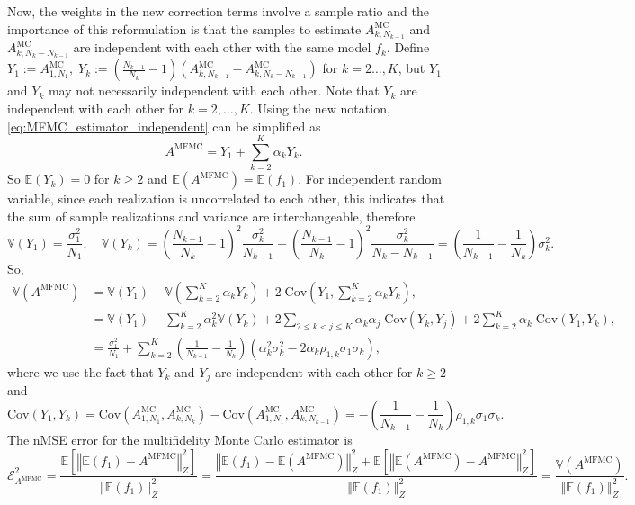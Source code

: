 \documentclass[final,3p,times,11pt]{elsarticle}
\begin{document}
Now, the weights in the new correction terms involve a sample ratio and the importance of this reformulation is that the samples to estimate $A_{k,N_{k-1}}^{\text{MC}}$ and $A_{k,N_k-N_{k-1}}^{\text{MC}}$ are independent with each other with the same model $f_k$. Define $Y_1 :=A^{\text{MC}}_{1,N_1},\; Y_k:=(\frac{N_{k-1}}{N_{k}}-1)(A_{k,N_{k-1}}^{\text{MC}}- A_{k,N_k-N_{k-1}}^{\text{MC}})$ for $k=2\ldots, K$, but $Y_1$ and $Y_k$ may not necessarily independent with each other.  Note that $Y_k$ are independent with each other for $k=2,\ldots, K$. Using the new notation, \eqref{eq:MFMC_estimator_independent} can be simplified as 
\[
A^{\text{MFMC}} = Y_1 + \sum_{k=2}^K \alpha_k Y_k.
\]
So $\mathbb{E}(Y_k) = 0$ for $k\ge 2$ and $\mathbb{E}(A^{\text{MFMC}}) = \mathbb{E}(f_1) $. For independent random variable, since each realization is uncorrelated to each other, this indicates that the sum of sample realizations and variance are interchangeable, therefore
\[
\mathbb{V}\left(Y_1\right) = \frac{\sigma_1^2}{N_1}, \quad \mathbb{V}\left(Y_k\right) = \left(\frac{N_{k-1}}{N_{k}}-1\right)^2\frac{\sigma_k^2}{N_{k-1}}+\left(\frac{N_{k-1}}{N_{k}}-1\right)^2\frac{\sigma_k^2}{N_k-N_{k-1}} = \left(\frac{1}{N_{k-1}} - \frac{1}{N_k}\right)\sigma_k^2.
\]
So,
\begin{align}
    \nonumber
    \mathbb{V}\left(A^{\text{MFMC}}\right) &= \mathbb{V}\left(Y_1\right) + \mathbb{V}\left(\sum_{k=2}^K \alpha_kY_k\right)+2\;\text{Cov}\left(Y_1,\sum_{k=2}^K \alpha_k Y_k \right),\\
    \nonumber
    &=\mathbb{V}\left(Y_1\right) + \sum_{k=2}^K \alpha_k^2 \mathbb{V}\left(Y_k\right)+2\sum_{2\le k<j\le K} \alpha_k\alpha_j\; \text{Cov}(Y_k,Y_j) +2\sum_{k=2}^K \alpha_k\;\text{Cov}\left(Y_1, Y_k\right),\\
    \label{eq:MFMC_variance}
    &=\frac{\sigma_1^2}{N_1} + \sum_{k=2}^K \left(\frac{1}{N_{k-1}} - \frac{1}{N_k}\right)\left(\alpha_k^2\sigma_k^2 - 2\alpha_k\rho_{1,k}\sigma_1\sigma_k\right),
\end{align}
where we use the fact that $Y_k$ and $Y_j$ are independent with each other for $k\ge 2$ and \cite[Lemma~3.2]{PeWiGu:2016}
\[
\text{Cov}(Y_1,Y_k) = \text{Cov}\left(A^{\text{MC}}_{1,N_1},A^{\text{MC}}_{k,N_k}\right) - \text{Cov}\left(A^{\text{MC}}_{1,N_1},A^{\text{MC}}_{k,N_{k-1}}\right) = - \left(\frac{1}{N_{k-1}} - \frac{1}{N_k}\right)\rho_{1,k}\sigma_1\sigma_k.
\]
The nMSE error for the multifidelity Monte Carlo estimator is
\[
\mathcal{E}_{A^{\text{MFMC}}}^2=\frac{\mathbb E\left[\left\Vert\mathbb{E}(f_1)-A^{\text{MFMC}} \right\Vert_{Z}^2\right]}{\left\Vert\mathbb{E}(f_1) \right\Vert_{Z}^2} = \frac{\left\Vert\mathbb{E}(f_1)-\mathbb{E}(A^{\text{MFMC}}) \right\Vert_{Z}^2+\mathbb E\left[\left\Vert\mathbb{E}(A^{\text{MFMC}})-A^{\text{MFMC}} \right\Vert_{Z}^2\right]}{\left\Vert\mathbb{E}(f_1) \right\Vert_{Z}^2} = \frac{\mathbb{V}\left(A^{\text{MFMC}}\right)}{\left\Vert\mathbb{E}(f_1) \right\Vert_{Z}^2}.
\]
\end{document}

